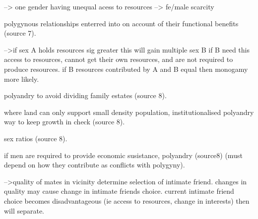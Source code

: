 --> one gender having unequal acess to resources
--> fe/male scarcity

polygynous relationships enterred into on account of their functional benefits (source 7).

-->if sex A holds resources sig greater this will gain multiple sex B if B need this access to resources, cannot get their own resources, and are not required to produce resources. if B resources contributed by A and B equal then monogamy more likely.

polyandry to avoid dividing family estates (source 8).

where land can only support small density population, institutionalised polyandry way to keep growth in check (source 8).

sex ratios (source 8).

if men are required to provide economic susistance, polyandry (source8) (must depend on how they contribute as conflicts with polygyny).  

-->quality of mates in vicinity determine selection of intimate friend. changes in quality may cause change in intimate friends choice. current intimate friend choice becomes disadvantageous (ie access to resources, change in interests) then will separate.




